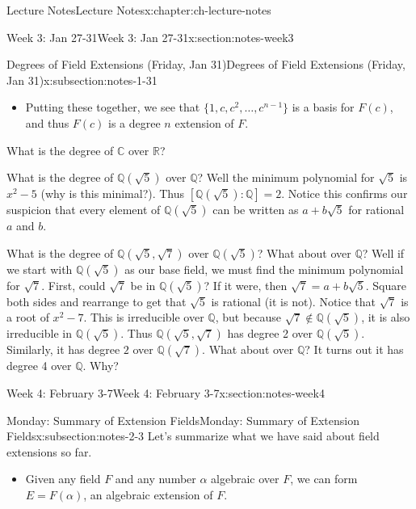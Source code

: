 \documentclass[oneside,11pt,]{book}
\begin{document}
\begin{chapterptx}{Lecture Notes}{}{Lecture Notes}{}{}{x:chapter:ch-lecture-notes}
\begin{sectionptx}{Week 3: Jan 27-31}{}{Week 3: Jan 27-31}{}{}{x:section:notes-week3}
\begin{subsectionptx}{Degrees of Field Extensions (Friday, Jan 31)}{}{Degrees of Field Extensions (Friday, Jan 31)}{}{}{x:subsection:notes-1-31}
\begin{itemize}[label=\textbullet]
\item{}Putting these together, we see that \(\{1, c, c^2, \ldots, c^{n-1}\}\) is a basis for \(F(c)\), and thus \(F(c)\) is a degree \(n\) extension of \(F\).%
\end{itemize}
%
\par
What is the degree of \(\mathbb C\) over \(\mathbb R\)?%
\par
What is the degree of \(\mathbb Q(\sqrt{5})\) over \(\mathbb Q\)? Well the minimum polynomial for \(\sqrt{5}\) is \(x^2 - 5\) (why is this minimal?). Thus \([\mathbb Q(\sqrt{5}):\mathbb Q] = 2\). Notice this confirms our suspicion that every element of \(\mathbb Q(\sqrt 5)\) can be written as \(a + b\sqrt 5\) for rational \(a\) and \(b\).%
\par
What is the degree of \(\mathbb Q(\sqrt{5},\sqrt{7})\) over \(\mathbb Q(\sqrt{5})\)? What about over \(\mathbb Q\)? Well if we start with \(\mathbb Q(\sqrt{5})\) as our base field, we must find the minimum polynomial for \(\sqrt{7}\). First, could \(\sqrt{7}\) be in \(\mathbb Q(\sqrt 5)\)? If it were, then \(\sqrt{7} = a+b\sqrt{5}\). Square both sides and rearrange to get that \(\sqrt{5}\) is rational (it is not). Notice that \(\sqrt{7}\) is a root of \(x^2 - 7\). This is irreducible over \(\mathbb Q\), but because \(\sqrt{7} \notin \mathbb Q(\sqrt{5})\), it is also irreducible in \(\mathbb Q(\sqrt{5})\). Thus \(\mathbb Q(\sqrt{5},\sqrt{7})\) has degree 2 over \(\mathbb Q(\sqrt{5})\). Similarly, it has degree \(2\) over \(\mathbb Q(\sqrt{7})\). What about over \(\mathbb Q\)? It turns out it has degree 4 over \(\mathbb Q\). Why?%
\end{subsectionptx}
\end{sectionptx}
%
%
\typeout{************************************************}
\typeout{************************************************}
%
\begin{sectionptx}{Week 4: February 3-7}{}{Week 4: February 3-7}{}{}{x:section:notes-week4}
%
%
\typeout{************************************************}
\typeout{************************************************}
%
\begin{subsectionptx}{Monday: Summary of Extension Fields}{}{Monday: Summary of Extension Fields}{}{}{x:subsection:notes-2-3}
Let's summarize what we have said about field extensions so far.%
\begin{itemize}[label=\textbullet]
\item{}Given any field \(F\) and any number \(\alpha\) algebraic over \(F\), we can form \(E = F(\alpha)\), an algebraic extension of \(F\).%

\end{itemize}
\end{subsectionptx}
\end{sectionptx}
\end{chapterptx}
\end{document}
